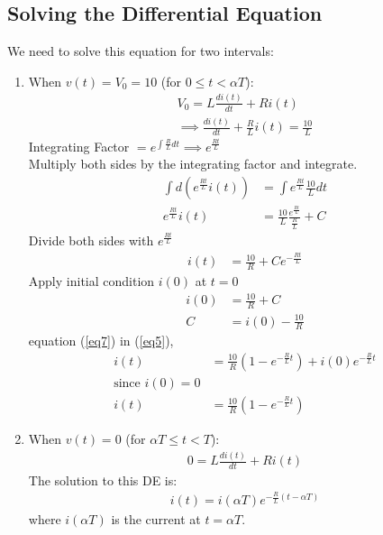 \begin{multicols}{2}
\subsection{Solving the Differential Equation}
We need to solve this equation for two intervals:
\begin{enumerate}
    \item When \(v(t) = V_0=10\) (for \(0 \leq t < \alpha T\)):
    \begin{align}
        V_0 = L \frac{di(t)}{dt} + R i(t)\\
        \implies\frac{di(t)}{dt}+\frac{R}{L}i(t) =\frac{10}{L}
    \end{align}
    Integrating Factor $= e^{\int \frac{R}{L}dt}\implies e^{\frac{Rt}{L}}$\\
    Multiply both sides by the integrating factor and integrate.\\
    \begin{align}
        \int d(e^{\frac{Rt}{L}}i(t))&=\int e^{\frac{Rt}{L}}\frac{10}{L}dt\\
        e^{\frac{Rt}{L}}i(t) &= \frac{10}{L}\frac{e^{\frac{Rt}{L}}}{\frac{R}{L}} + C
    \end{align}
    Divide both sides with $e^{\frac{Rt}{L}}$
    \begin{align}
        i(t)&=\frac{10}{R} +Ce^{-\frac{Rt}{L}} \label{eq5}
    \end{align}
    Apply initial condition  $i(0)$ at $t=0$\\
    \begin{align}
        i(0)&=\frac{10}{R} +C\\
        C&=i(0)-\frac{10}{R} \label{eq7}
    \end{align}
    equation (\ref{eq7}) in (\ref{eq5}),
    \begin{align}
       i(t) &= \frac{10}{R} \left(1 - e^{-\frac{R}{L}t}\right) + i(0) e^{-\frac{R}{L}t}\\
       \text{since $i(0)=0$}\\
       i(t) &= \frac{10}{R} \left(1 - e^{-\frac{R}{L}t}\right)
    \end{align}
    \item When \(v(t) = 0\) (for \(\alpha T \leq t < T\)):
    \begin{align}
        0 = L \frac{di(t)}{dt} + R i(t)
    \end{align}
    The solution to this DE is:
    \begin{align}
        i(t) = i(\alpha T) e^{-\frac{R}{L}(t - \alpha T)}
    \end{align}
    where \(i(\alpha T)\) is the current at \(t = \alpha T\).
\end{enumerate}

\end{multicols}
